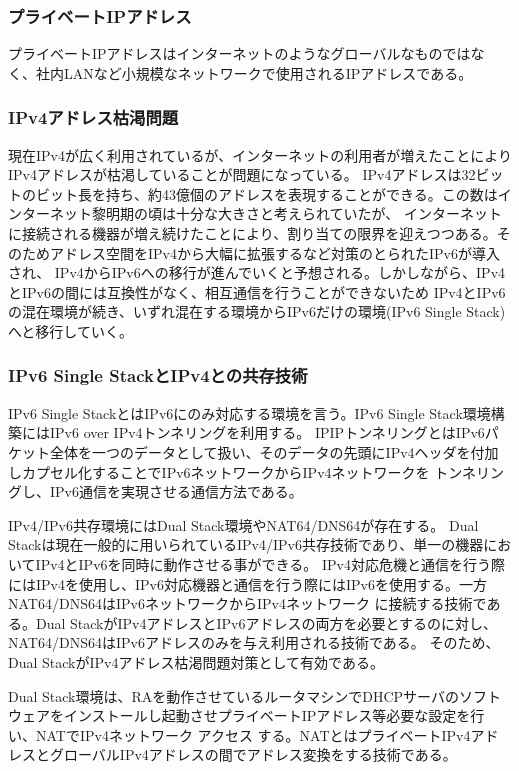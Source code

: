 \documentclass[a4j]{jarticle}
\begin{document}
\subsubsection{プライベートIPアドレス}
プライベートIPアドレスはインターネットのようなグローバルなものではなく、社内LANなど小規模なネットワークで使用されるIPアドレスである。

\subsubsection{IPv4アドレス枯渇問題}
現在IPv4が広く利用されているが、インターネットの利用者が増えたことによりIPv4アドレスが枯渇していることが問題になっている。
IPv4アドレスは32ビットのビット長を持ち、約43億個のアドレスを表現することができる。この数はインターネット黎明期の頃は十分な大きさと考えられていたが、
インターネットに接続される機器が増え続けたことにより、割り当ての限界を迎えつつある。そのためアドレス空間をIPv4から大幅に拡張するなど対策のとられたIPv6が導入され、
IPv4からIPv6への移行が進んでいくと予想される。しかしながら、IPv4とIPv6の間には互換性がなく、相互通信を行うことができないため
IPv4とIPv6の混在環境が続き、いずれ混在する環境からIPv6だけの環境(IPv6 Single Stack)へと移行していく。

\subsubsection{IPv6 Single StackとIPv4との共存技術}
IPv6 Single StackとはIPv6にのみ対応する環境を言う。IPv6 Single Stack環境構築にはIPv6 over IPv4トンネリングを利用する。
IPIPトンネリングとはIPv6パケット全体を一つのデータとして扱い、そのデータの先頭にIPv4ヘッダを付加しカプセル化することでIPv6ネットワークからIPv4ネットワークを
トンネリングし、IPv6通信を実現させる通信方法である。

IPv4/IPv6共存環境にはDual Stack環境やNAT64/DNS64が存在する。
Dual Stackは現在一般的に用いられているIPv4/IPv6共存技術であり、単一の機器においてIPv4とIPv6を同時に動作させる事ができる。
IPv4対応危機と通信を行う際にはIPv4を使用し、IPv6対応機器と通信を行う際にはIPv6を使用する。一方NAT64/DNS64はIPv6ネットワークからIPv4ネットワーク
に接続する技術である。Dual StackがIPv4アドレスとIPv6アドレスの両方を必要とするのに対し、NAT64/DNS64はIPv6アドレスのみを与え利用される技術である。
そのため、Dual StackがIPv4アドレス枯渇問題対策として有効である。

Dual Stack環境は、RAを動作させているルータマシンでDHCPサーバのソフトウェアをインストールし起動させプライベートIPアドレス等必要な設定を行い、NATでIPv4ネットワーク
アクセス
する。NATとはプライベートIPv4アドレスとグローバルIPv4アドレスの間でアドレス変換をする技術である。
\end{document}
